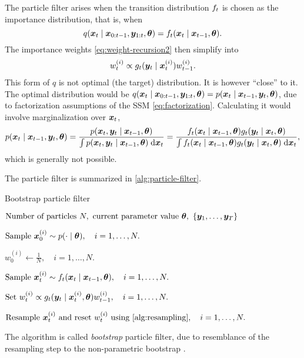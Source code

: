 The particle filter arises when the transition distribution $f_t$ is chosen as the importance distribution, that is, when
\begin{equation*}
q(\bm{x}_t \mid \bm{x}_{0:t-1}, \bm{y}_{1:t}, \bm{\theta}) = f_t(\bm{x}_t \mid \bm{x}_{t-1}, \bm{\theta}).
\end{equation*}
The importance weights \eqref{eq:weight-recursion2} then simplify into
\begin{equation} \label{eq:weight-recursion3}
w_t^{(i)} \propto g_t(\bm{y}_t \mid \bm{x}_t^{(i)}) w_{t-1}^{(i)}.
\end{equation}
This form of $q$ is not optimal (the target) distribution. It is however ``close'' to it. The optimal distribution would be $q(\bm{x}_t \mid \bm{x}_{0:t-1}, \bm{y}_{1:t}, \bm{\theta}) = p(\bm{x}_t \mid \bm{x}_{t-1}, \bm{y}_{t}, \bm{\theta})$, due to factorization assumptions of the SSM \eqref{eq:factorization}. Calculating it would involve marginalization over $\bm{x}_t$,
\begin{equation*}
p(\bm{x}_t \mid \bm{x}_{t-1}, \bm{y}_{t}, \bm{\theta}) = \frac{p(\bm{x}_t, \bm{y}_{t} \mid \bm{x}_{t-1}, \bm{\theta})}{\int p(\bm{x}_t, \bm{y}_{t} \mid \bm{x}_{t-1}, \bm{\theta}) \; \mathrm{d}{\bm{x}_t}} = \frac{f_t(\bm{x}_t \mid \bm{x}_{t-1}, \bm{\theta}) g_t(\bm{y}_t \mid \bm{x}_t, \bm{\theta})}{\int f_t(\bm{x}_t \mid \bm{x}_{t-1}, \bm{\theta}) g_t(\bm{y}_t \mid \bm{x}_t, \bm{\theta}) \; \mathrm{d}{\bm{x}_t}},
\end{equation*}
which is generally not possible.

The particle filter is summarized in \autoref{alg:particle-filter}.
\begin{algorithm}[ht]
    \caption{Bootstrap particle filter}
    \label{alg:particle-filter}
    \begin{algorithmic}[1]
        \Input $\text{Number of particles } N,\ \text{current parameter value } \btheta,\ \left\{\by_1, \ldots, \by_T\right\}$
        
        \State $\text{Sample } \bm{x}_0^{(i)} \sim p(\cdot \mid \bm{\theta}), \quad i = 1, \ldots, N.$ 
        
        \State $w_0^{(i)} \gets \frac{1}{N}, \quad i = 1, \ldots, N.$ 
        
        \State $\text{Sample } \bm{x}_t^{(i)} \sim f_t(\bm{x}_t \mid \bm{x}_{t-1}, \bm{\theta}), \quad i = 1, \ldots, N.$ 
        
        \State $\text{Set } w_t^{(i)} \propto g_t(\bm{y}_t \mid \bm{x}_t^{(i)}, \bm{\theta}) w_{t-1}^{(i)}, \quad i = 1, \ldots, N.$ 
        
        \State $\text{Resample } \bx_t^{(i)} \text{ and reset } w_t^{(i)} \text{ using \autoref{alg:resampling}}, \quad i = 1, \ldots, N.$
        \EndFor
    \end{algorithmic}
\end{algorithm}
The algorithm is called \emph{bootstrap} particle filter, due to resemblance of the resampling step to the non-parametric bootstrap \citep{bootstrap}.



